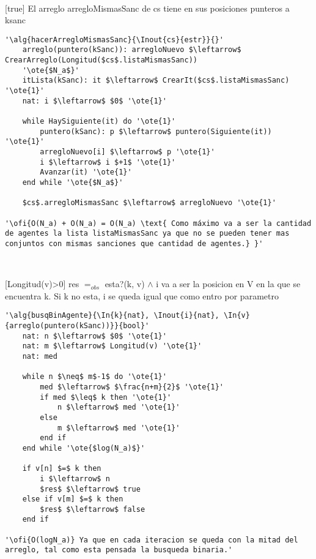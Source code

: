 ~


[true]
{El arreglo arregloMismasSanc de cs tiene en sus posiciones punteros a ksanc}


\begin{lstlisting}[mathescape]
'\alg{hacerArregloMismasSanc}{\Inout{cs}{estr}}{}'
	arreglo(puntero(kSanc)): arregloNuevo $\leftarrow$ CrearArreglo(Longitud($cs$.listaMismasSanc))
	'\ote{$N_a$}'
	itLista(kSanc): it $\leftarrow$ CrearIt($cs$.listaMismasSanc) '\ote{1}'
	nat: i $\leftarrow$ $0$ '\ote{1}'

	while HaySiguiente(it) do '\ote{1}'
		puntero(kSanc): p $\leftarrow$ puntero(Siguiente(it)) '\ote{1}'
		arregloNuevo[i] $\leftarrow$ p '\ote{1}'
		i $\leftarrow$ i $+1$ '\ote{1}'
		Avanzar(it) '\ote{1}'
	end while '\ote{$N_a$}'

	$cs$.arregloMismasSanc $\leftarrow$ arregloNuevo '\ote{1}'

'\ofi{O(N_a) + O(N_a) = O(N_a) \text{ Como máximo va a ser la cantidad de agentes la lista listaMismasSanc ya que no se pueden tener mas conjuntos con mismas sanciones que cantidad de agentes.} }'
\end{lstlisting}

~


[Longitud(v)>0]
{res $=_{obs}$ esta?(k, v) $\land$ i va a ser la posicion en V en la que se encuentra k. Si k no esta, i se queda igual que como entro por parametro}

\begin{lstlisting}[mathescape]
'\alg{busqBinAgente}{\In{k}{nat}, \Inout{i}{nat}, \In{v}{arreglo(puntero(kSanc))}}{bool}'
	nat: n $\leftarrow$ $0$ '\ote{1}'
	nat: m $\leftarrow$ Longitud(v) '\ote{1}'
	nat: med

	while n $\neq$ m$-1$ do '\ote{1}'
		med $\leftarrow$ $\frac{n+m}{2}$ '\ote{1}'
		if med $\leq$ k then '\ote{1}'
			n $\leftarrow$ med '\ote{1}'
		else
			m $\leftarrow$ med '\ote{1}'
		end if
	end while '\ote{$log(N_a)$}'

	if v[n] $=$ k then
		i $\leftarrow$ n
		$res$ $\leftarrow$ true
	else if v[m] $=$ k then
		$res$ $\leftarrow$ false
	end if

'\ofi{O(logN_a)} Ya que en cada iteracion se queda con la mitad del arreglo, tal como esta pensada la busqueda binaria.'
\end{lstlisting}

~


